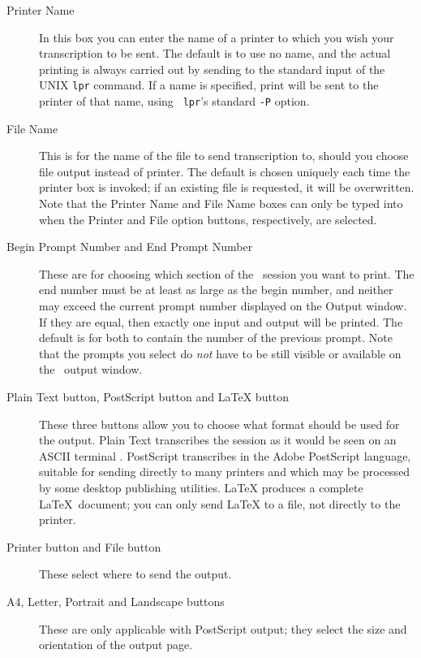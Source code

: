 \begin{description}

\item[Printer Name] In this box you can enter the name of a printer to
which you wish your transcription to be sent.  The default is to use
no name, and the actual printing is always carried out by sending to
the standard input of the UNIX {\tt lpr} command.  If a name is
specified, print will be sent to the printer of that name, using {\tt
lpr}'s standard {\tt -P} option.

\item[File Name] This is for the name of the file to send
transcription to, should you choose file output instead of printer.
The default is chosen uniquely each time the printer box is invoked;
if an existing file is requested, it will be overwritten.  Note that
the Printer Name and File Name boxes can only be typed into when the
Printer and File option buttons, respectively, are selected.

\item[Begin Prompt Number {\rm and} End Prompt Number] These are for
choosing which section of the \xr\ session you want to print.  The end
number must be at least as large as the begin number, and neither may
exceed the current prompt number displayed on the Output window.  If
they are equal, then exactly one input and output will be printed.
The default is for both to contain the number of the previous prompt.
Note that the prompts you select do {\it not\/} have to be still
visible or available on the \xr\ output window.

\item[Plain Text button{\rm , } PostScript button {\rm and} LaTeX
button] These three buttons allow you to choose what format should be
used for the output.  Plain Text transcribes the session as it would
be seen on an ASCII terminal \REDUCE{}.  PostScript transcribes in the
Adobe PostScript language, suitable for sending directly to many
printers and which may be processed by some desktop publishing
utilities.  LaTeX produces a complete \LaTeX\ document; you can only
send \LaTeX{} to a file, not directly to the printer.

\item[Printer button {\rm and} File button] These select where to send
the output.

\item[A4{\rm , } Letter{\rm , } Portrait {\rm and} Landscape buttons]
These are only applicable with PostScript output; they select the size
and orientation of the output page.

\end{description}

